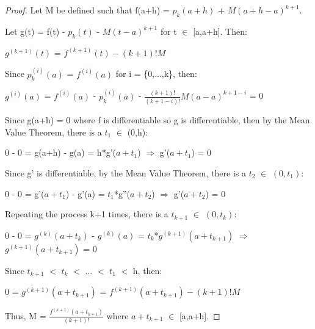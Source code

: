     \begin{proof}
        Let M be defined such that f(a+h) = $p_k(a+h)$ + $M(a+h-a)^{k+1}$.

        Let g(t) = f(t) - $p_k(t)$ - $M(t-a)^{k+1}$ for t $\in$ [a,a+h]. Then:

        \hspace{0.5cm}
        $g^{(k+1)}(t)$ = $f^{(k+1)}(t) - (k+1)!M$

        Since $p_k^{(i)}(a)$ = $f^{(i)}(a)$ for i = \{0,...,k\}, then:
        
        \hspace{0.5cm}
        $g^{(i)}(a)$ = $f^{(i)}(a)$ - $p_k^{(i)}(a)$
                        - $\frac{(k+1)!}{(k+1-i)!}M(a-a)^{k+1-i}$ = 0

        Since g(a+h) = 0 where f is differentiable so g is differentiable,
        then by the Mean Value Theorem, there is a $t_1$ $\in$ (0,h):

        \hspace{0.5cm}
        0 - 0
        = g(a+h) - g(a)
        = h*g'($a+t_1$)
        \hspace{0.5cm}
        $\Rightarrow$
        \hspace{0.5cm}
        g'($a+t_1$) = 0

        Since g' is differentiable, by the Mean Value Theorem,
        there is a $t_2$ $\in$ $(0,t_1)$:

        \hspace{0.5cm}
        0 - 0
        = g'($a+t_1$) - g'(a)
        = $t_1$*g''($a+t_2$)
        \hspace{0.5cm}
        $\Rightarrow$
        \hspace{0.5cm}
        g'($a+t_2$) = 0

        Repeating the process k+1 times, there is a $t_{k+1}$ $\in$ $(0,t_k)$:

        \hspace{0.5cm}
        0 - 0
        = $g^{(k)}(a+t_k)$ - $g^{(k)}(a)$
        = $t_k$*$g^{(k+1)}(a+t_{k+1})$
        \hspace{0.5cm}
        $\Rightarrow$
        \hspace{0.5cm}
        $g^{(k+1)}(a+t_{k+1})$ = 0

        Since $t_{k+1}$ $<$ $t_k$ $<$ ... $<$ $t_1$ $<$ h, then:

        \hspace{0.5cm}
        0 = $g^{(k+1)}(a+t_{k+1})$ = $f^{(k+1)}(a+t_{k+1}) - (k+1)!M$

        Thus, M = $\frac{f^{(k+1)}(a+t_{k+1})}{(k+1)!}$
        where $a+t_{k+1}$ $\in$ [a,a+h].
    \end{proof}

